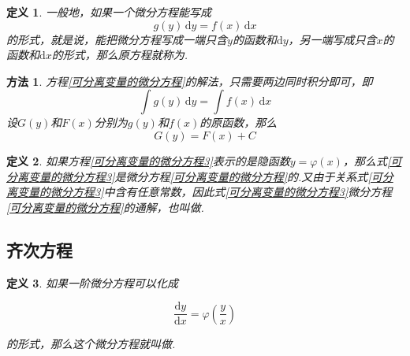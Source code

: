 \documentclass[12pt,a4paper]{book}
\numberwithin{equation}{section}
\newtheorem{method}{\hspace*{0.3cm}\color{ff}\textleaf 方法}[section]
\newtheorem{defination}{\hspace*{0.3cm}\color{dy}\FiveFlowerOpen \hspace*{0.2cm}定义}[section]
\begin{document}
\begin{defination}
    \hspace*{0.3cm}一般地，如果一个微分方程能写成
    \begin{equation}
        g(y)\,\mathrm{d}y=f(x)\,\mathrm{d}x
        \label{可分离变量的微分方程}
    \end{equation}
    的形式，就是说，能把微分方程写成一端只含$y$的函数和$\mathrm{d}y$，另一端写成只含$x$的函数和$\mathrm{d}x$的形式，那么原方程就称为.
\end{defination}

\begin{method}
    \hspace*{0.3cm}方程\eqref{可分离变量的微分方程}的解法，只需要两边同时积分即可，即
    \begin{equation}
        \int g(y)\,\mathrm{d}y=\int f(x)\,\mathrm{d}x
        \label{可分离变量的微分方程2}
    \end{equation}
    设$G(y)$和$F(x)$分别为$g(y)$和$f(x)$的原函数，那么
    \begin{equation}
        G(y)=F(x)+C
        \label{可分离变量的微分方程3}
    \end{equation}
\end{method}

\begin{defination}
    \hspace*{0.3cm}如果方程\eqref{可分离变量的微分方程3}表示的是隐函数$y=\varphi (x)$，那么式\eqref{可分离变量的微分方程3}是微分方程\eqref{可分离变量的微分方程}的.又由于关系式\eqref{可分离变量的微分方程3}中含有任意常数，因此式\eqref{可分离变量的微分方程3}微分方程\eqref{可分离变量的微分方程}的通解，也叫做.
\end{defination}
\vspace{0.3cm}

\subsection{齐次方程}

\begin{defination}
    \hspace*{0.3cm}如果一阶微分方程可以化成

    \begin{equation}
        \frac{\mathrm{d}y}{\mathrm{d}x}=\varphi (\frac{y}{x})
        \label{齐次方程1}
    \end{equation}

    的形式，那么这个微分方程就叫做.
\end{defination}
\end{document}
